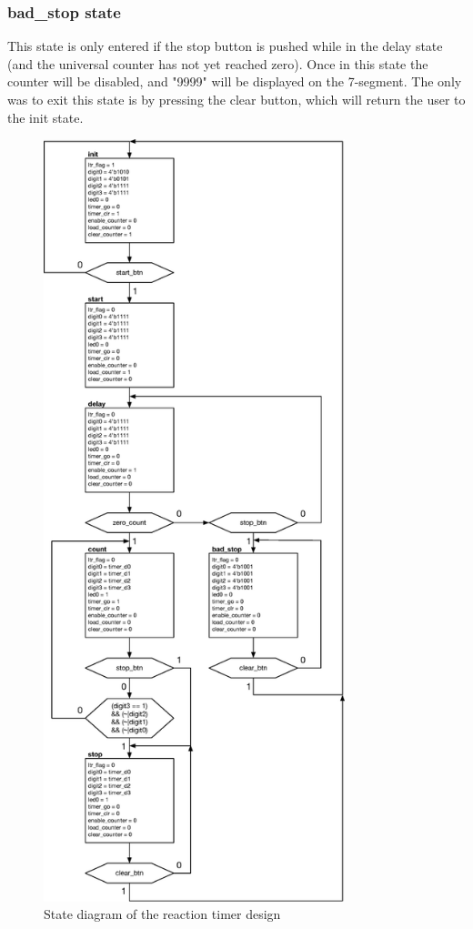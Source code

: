 \documentclass[11pt]{article}
\begin{document}
\subsubsection{bad\_stop state}
This state is only entered if the stop button is pushed while in the delay state (and the universal counter has not yet reached zero). Once in this state the counter will be disabled, and "9999" will be displayed on the 7-segment. The only was to exit this state is by pressing the clear button, which will return the user to the init state.

\pagebreak
\begin{figure}[H]
	\includegraphics [width=3.45in]{state_diagram.eps}
	\centering
	\caption{State diagram of the reaction timer design}
	\label{fig:state_diagram}
\end{figure}
\end{document}
